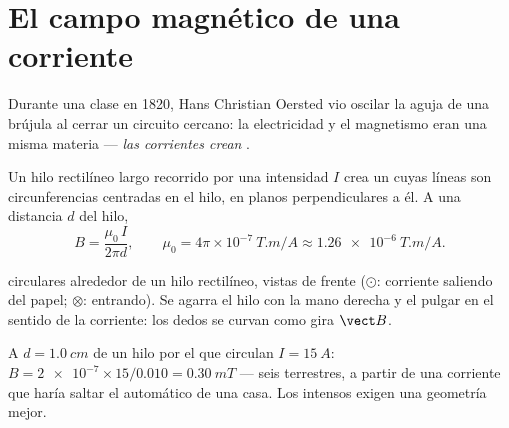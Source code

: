 \section{El campo magnético de una corriente}

\begin{remark}[Oersted, 1820]\label{rem:g11:magnetic-fields:oersted}
Durante una clase en 1820, Hans Christian Oersted vio oscilar la aguja
de una brújula al cerrar un circuito cercano: la electricidad y el
magnetismo eran una misma materia --- \emph{las corrientes crean }.
\end{remark}

\begin{proposition}\label{prop:g11:magnetic-fields:wire}
Un hilo rectilíneo largo recorrido por una intensidad $I$ crea un 
cuyas líneas son circunferencias centradas en el hilo, en planos
perpendiculares a él. A una distancia $d$ del hilo,
\[
B = \frac{\mu_0\, I}{2\pi d},
\qquad \mu_0 = 4\pi\times 10^{-7}\ \unit{T.m/A} \approx \qty{1.26e-6}{T.m/A}.
\]
\end{proposition}
\admitted

\begin{omfigure}
\qquad\qquad
{}

{\small {} circulares alrededor de un hilo rectilíneo,
vistas de frente ($\odot$: corriente saliendo del papel; $\otimes$:
entrando). Se agarra el hilo con la mano derecha y el pulgar en el
sentido de la corriente: los dedos se curvan como gira $\vect B$.}
\end{omfigure}

\begin{example}\label{ex:g11:magnetic-fields:wire}
A $d = \qty{1.0}{cm}$ de un hilo por el que circulan $I = \qty{15}{A}$:
$B = \num{2e-7} \times 15 / 0.010 = \qty{0.30}{mT}$ --- seis 
terrestres, a partir de una corriente que haría saltar el automático de
una casa. Los  intensos exigen una geometría mejor.
\end{example}

